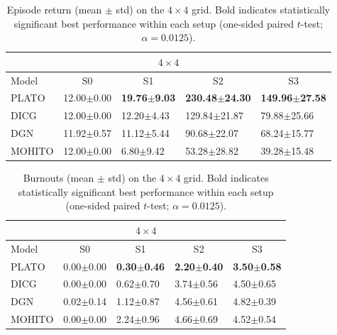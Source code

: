 \begin{table}[t]
\centering
\small
\setlength{\tabcolsep}{2.5pt}
\renewcommand{\arraystretch}{1.03}
\begin{tabular}{l|l|l|l|l}
\toprule
\multicolumn{5}{c}{$4\times 4$} \\
\midrule
Model & \multicolumn{1}{c|}{S0} & \multicolumn{1}{c|}{S1} & \multicolumn{1}{c|}{S2} & \multicolumn{1}{c}{S3} \\
\midrule
PLATO & 12.00$\pm$0.00 & \textbf{19.76$\pm$9.03} & \textbf{230.48$\pm$24.30} & \textbf{149.96$\pm$27.58} \\
DICG & 12.00$\pm$0.00 & 12.20$\pm$4.43 & 129.84$\pm$21.87 & 79.88$\pm$25.66 \\
DGN & 11.92$\pm$0.57 & 11.12$\pm$5.44 & 90.68$\pm$22.07 & 68.24$\pm$15.77 \\
MOHITO  & 12.00$\pm$0.00 & 6.80$\pm$9.42 & 53.28$\pm$28.82 & 39.28$\pm$15.48 \\
\bottomrule
\end{tabular}
\caption{Episode return (mean $\pm$ std) on the $4\times 4$ grid. Bold indicates statistically significant best performance within each setup (one-sided paired $t$-test; $\alpha=0.0125$).}
\label{tab:reward_4x4}
\end{table}



\begin{table}[t]
\centering
\small
\setlength{\tabcolsep}{2.5pt}
\renewcommand{\arraystretch}{1.03}
\begin{tabular}{l|l|l|l|l}
\toprule
\multicolumn{5}{c}{$4\times 4$} \\
\midrule
Model & \multicolumn{1}{c|}{S0} & \multicolumn{1}{c|}{S1} & \multicolumn{1}{c|}{S2} & \multicolumn{1}{c}{S3} \\
\midrule
PLATO & 0.00$\pm$0.00 & \textbf{0.30$\pm$0.46} & \textbf{2.20$\pm$0.40} & \textbf{3.50$\pm$0.58} \\
DICG & 0.00$\pm$0.00 & 0.62$\pm$0.70 & 3.74$\pm$0.56 & 4.50$\pm$0.65 \\
DGN & 0.02$\pm$0.14 & 1.12$\pm$0.87 & 4.56$\pm$0.61 & 4.82$\pm$0.39 \\
MOHITO  & 0.00$\pm$0.00 & 2.24$\pm$0.96 & 4.66$\pm$0.69 & 4.52$\pm$0.54 \\
\bottomrule
\end{tabular}
\caption{Burnouts (mean $\pm$ std) on the $4\times 4$ grid. Bold indicates statistically significant best performance within each setup (one-sided paired $t$-test; $\alpha=0.0125$).}
\label{tab:burnouts_4x4}
\end{table}

